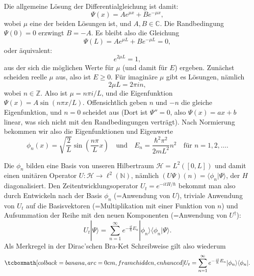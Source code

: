 Die allgemeine Lösung der Differentialgleichung ist damit: 
\begin{equation}
	\Psi(x) = A e^{\mu x} + B e^{-\mu x},
\end{equation}
wobei $\mu$ eine der beiden Lösungen ist, und $A,B \in \mathbb{C}$. Die Randbedingung $\Psi(0)= 0$ erzwingt $B = −A$. Es bleibt also die Gleichung 
\begin{equation}
	\Psi(L) =A e^{\mu L} + B e^{-\mu L} = 0,
\end{equation}
oder äquivalent: 
\begin{equation}
	e^{2\mu L} = 1,
\end{equation}
aus der sich die möglichen Werte für $\mu$ (und damit für $E$) ergeben. Zunächst scheiden reelle $\mu$ aus,
also ist $E \ge 0$. Für imaginäre $\mu$ gibt es Lösungen, nämlich 
\begin{equation}
	2\mu L = 2\pi i n,
\end{equation}
wobei $n \in \mathbb{Z}$. Also ist $\mu = n\pi i/L$, und die Eigenfunktion $Ψ(x) = A \sin(n\pi x/L)$.
Offensichtlich geben $n$ und $−n$ die gleiche Eigenfunktion, und $n = 0$ scheidet aus (Dort ist $\Psi'' =0$, also $
\Psi(x) = ax+b$ linear, was sich nicht mit den Randbedingungen verträgt). Nach Normierung bekommen wir also die Eigenfunktionen und Eigenwerte
\begin{equation}
	\phi_n(x) = \sqrt{\frac{2}{L}}\sin\left(\frac{n\pi}{L} x\right)\quad \text{und}\quad E_n = \frac{\hbar^2 \pi^2}{2mL^2}n^2\quad \text{für $n=1,2,\ldots$.}
\end{equation}

Die $\phi_n$ bilden eine Basis von unseren Hilbertraum $\mathcal{H} = L^2([0,L])$ und damit einen unitären
Operator $U:\mathcal{H} \rightarrow \ell^2(\mathbb{N})$, nämlich $(U\Psi)(n) = \langle \phi_n|\Psi\rangle$, der $H$ diagonalisiert. Den Zeitentwicklungsoperator $U_t = e^{−itH/\hbar}$ bekommt man also durch Entwickeln nach der Basis $\phi_n$ (=Anwendung von $U$), triviale Anwendung von $U_t$ auf die Basisvektoren (=Multiplikation mit einer Funktion von $n$) und Aufsummation der Reihe mit den neuen Komponenten (=Anwendung von $U^\dag$):
\begin{equation}
	U_t |\Psi\rangle = \sum_{n=1}^{\infty} e^{-\frac{it}{\hbar} E_n} |\phi_n\rangle \langle \phi_n|\Psi\rangle. 
\end{equation}
Als Merkregel in der Dirac'schen Bra-Ket Schreibweise gilt also wiederum
\begin{equation}
	\eqbox{U_t = \sum_{n=1}^{\infty} e^{-\frac{it}{\hbar} E_n} |\phi_n\rangle \langle \phi_n|.}
\end{equation}

